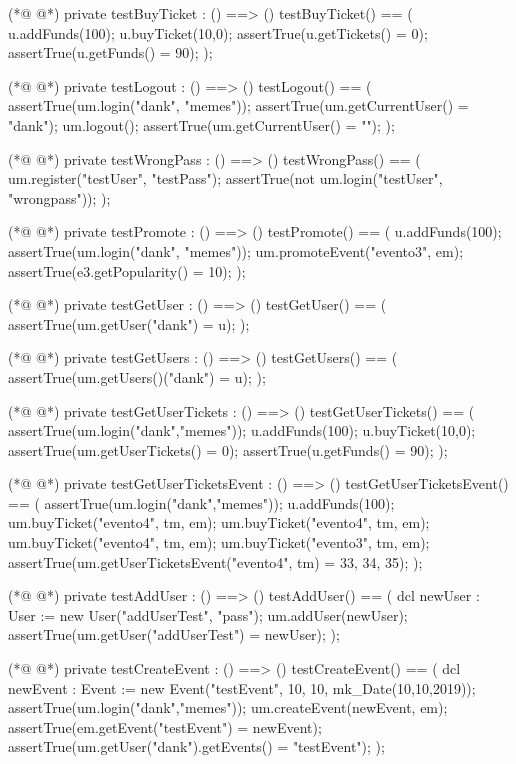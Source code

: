 \begin{vdmpp}[breaklines=true]
(*@
\label{testBuyTicket:76}
@*)
 private testBuyTicket : () ==> ()
 testBuyTicket() == (
  u.addFunds(100);
  u.buyTicket(10,0);
  assertTrue(u.getTickets() = {0});
  assertTrue(u.getFunds() = 90);
 );
 
(*@
\label{testLogout:84}
@*)
 private testLogout : () ==> ()
 testLogout() == (
  assertTrue(um.login("dank", "memes"));
  assertTrue(um.getCurrentUser() = "dank");
  um.logout();
  assertTrue(um.getCurrentUser() = "");
 );
 
(*@
\label{testWrongPass:92}
@*)
 private testWrongPass : () ==> ()
 testWrongPass() == (
  um.register("testUser", "testPass");
  assertTrue(not um.login("testUser", "wrongpass"));
 );
 
(*@
\label{testPromote:98}
@*)
 private testPromote : () ==> ()
 testPromote() == (
  u.addFunds(100);
  assertTrue(um.login("dank", "memes"));
  um.promoteEvent("evento3", em);
  assertTrue(e3.getPopularity() = 10);
 );
 
(*@
\label{testGetUser:106}
@*)
 private testGetUser : () ==> ()
 testGetUser() == (
  assertTrue(um.getUser("dank") = u);
 );
 
(*@
\label{testGetUsers:111}
@*)
 private testGetUsers : () ==> ()
 testGetUsers() == (
  assertTrue(um.getUsers()("dank") = u);
 );
 
(*@
\label{testGetUserTickets:116}
@*)
 private testGetUserTickets : () ==> ()
 testGetUserTickets() == (
  assertTrue(um.login("dank","memes"));
  u.addFunds(100);
  u.buyTicket(10,0);
  assertTrue(um.getUserTickets() = {0});
  assertTrue(u.getFunds() = 90);
 );
 
(*@
\label{testGetUserTicketsEvent:125}
@*)
 private testGetUserTicketsEvent : () ==> ()
 testGetUserTicketsEvent() == (
  assertTrue(um.login("dank","memes"));
  u.addFunds(100);
  um.buyTicket("evento4", tm, em);
  um.buyTicket("evento4", tm, em);
  um.buyTicket("evento4", tm, em);
  um.buyTicket("evento3", tm, em);
  assertTrue(um.getUserTicketsEvent("evento4", tm) = {33, 34, 35});
 );
 
(*@
\label{testAddUser:136}
@*)
 private testAddUser : () ==> ()
 testAddUser() == (
  dcl newUser : User := new User("addUserTest", "pass");
  um.addUser(newUser);
  assertTrue(um.getUser("addUserTest") = newUser);
 );
 
(*@
\label{testCreateEvent:143}
@*)
 private testCreateEvent : () ==> ()
 testCreateEvent() == (
  dcl newEvent : Event := new Event("testEvent", 10, 10, mk_Date(10,10,2019));
  assertTrue(um.login("dank","memes"));
  um.createEvent(newEvent, em);
  assertTrue(em.getEvent("testEvent") = newEvent);
  assertTrue(um.getUser("dank").getEvents() = {"testEvent"});
 );
 

\end{vdmpp}
